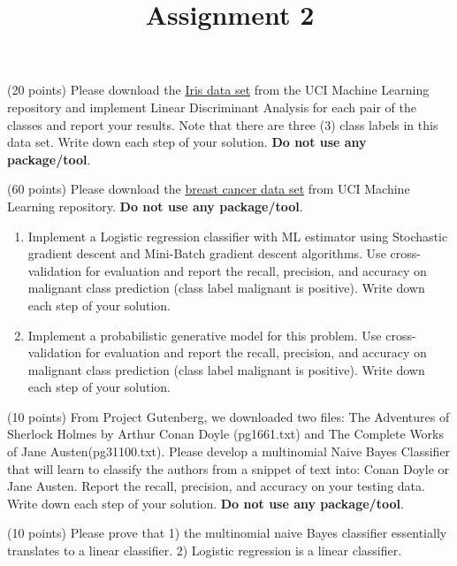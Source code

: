 \documentclass{exam}
\title{Assignment 2}
\date{}
\begin{document}
\maketitle
\thispagestyle{headandfoot}

\begin{center}
  {}
\end{center}
\vspace{.5cm}
\begin{questions}

 (20 points) Please download the \href{https://archive.ics.uci.edu/ml/datasets/Iris}{Iris data set} from the UCI Machine Learning repository and implement Linear Discriminant Analysis for each pair of the classes and report your results. Note that there are three (3) class labels in this data set. Write down each step of your solution. \textbf{Do not use any package/tool}. 
\vspace{5em}
 
 (60 points) Please download the \href{https://archive.ics.uci.edu/ml/datasets/Breast+Cancer+Wisconsin+\%28Diagnostic\%29}{breast cancer data set} from UCI Machine Learning repository. \textbf{Do not use any package/tool}. 
\begin{enumerate}
\item Implement a Logistic regression classifier with ML estimator using Stochastic gradient descent and Mini-Batch gradient descent algorithms. Use cross-validation for evaluation and report the recall, precision, and accuracy on malignant class prediction (class label malignant is positive). Write down each step of your solution.
\item Implement a probabilistic generative model for this problem. Use cross-validation for evaluation and report the recall, precision, and accuracy on malignant class prediction (class label malignant is positive). Write down each step of your solution.
\end{enumerate}
\vspace{5em}

 (10 points) From Project Gutenberg, we downloaded two files: The Adventures of Sherlock Holmes by Arthur Conan Doyle (pg1661.txt) and The Complete Works of Jane Austen(pg31100.txt). Please develop a multinomial Naive Bayes Classifier that will learn to classify the authors from a snippet of text into: Conan Doyle or Jane Austen. Report the recall, precision, and accuracy  on your testing data. Write down each step of your solution. \textbf{Do not use any package/tool}. 

\vspace{5em}

 (10 points) Please prove that 1) the multinomial naive Bayes classifier essentially translates to a linear classifier. 2) Logistic regression is a linear classifier.
\vspace{5em}




\end{questions}
\end{document}
